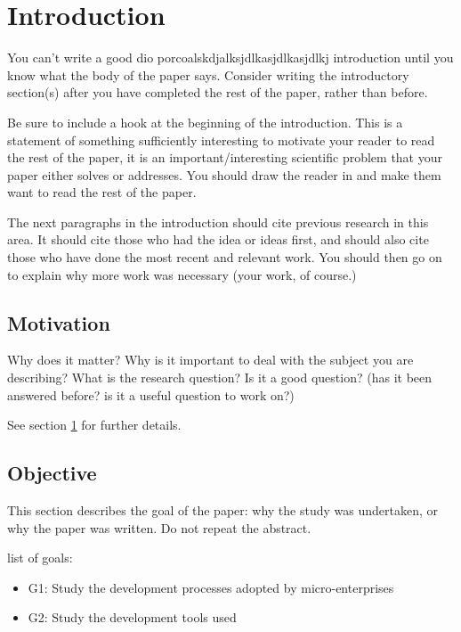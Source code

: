 \chapter{Introduction}
\label{sec:Introduction}

You can't write a good dio porcoalskdjalksjdlkasjdlkasjdlkj introduction until
you know what the body of the paper says. Consider writing the introductory section(s) after you have completed the
rest of the paper, rather than before.

Be sure to include a hook at the beginning of the introduction. This is a
statement of something sufficiently interesting to motivate your reader to read
the rest of the paper, it is an important/interesting scientific problem that
your paper either solves or addresses. You should draw the reader in and make
them want to read the rest of the paper.

The next paragraphs in the introduction should cite previous research in this
area. It should cite those who had the idea or ideas first, and should also cite
those who have done the most recent and relevant work. You should then go on to
explain why more work was necessary (your work, of course.)
 
\section{Motivation}
\label{sec:Motivation}

Why does it matter? Why is it important to deal with the subject you are
describing? What is the research question? Is it a good question? (has it been
answered before? is it a useful question to work on?)

See section \ref{sec:Introduction} for further details.

\section{Objective}
\label{sec:Objective}

This section describes the goal of the paper: why the study was undertaken, or
why the paper was written. Do not repeat the abstract.

list of goals:
\begin{itemize}
  \item G1: Study the development processes adopted by micro-enterprises
  \item G2: Study the development tools used 
\end{itemize}

